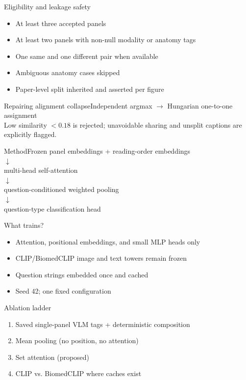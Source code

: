 \documentclass[aspectratio=169]{beamer}
\begin{document}
\begin{frame}{Eligibility and leakage safety}\begin{itemize}\item At least three accepted panels\item At least two panels with non-null modality or anatomy tags\item One same and one different pair when available\item Ambiguous anatomy cases skipped\item Paper-level split inherited and asserted per figure\end{itemize}\end{frame}
\begin{frame}{Repairing alignment collapse}\centering Independent argmax $\rightarrow$ Hungarian one-to-one assignment\\[1em]Low similarity $<0.18$ is rejected; unavoidable sharing and unsplit captions are explicitly flagged.\end{frame}
\begin{frame}{Method}\centering Frozen panel embeddings + reading-order embeddings\\$\downarrow$\\multi-head self-attention\\$\downarrow$\\question-conditioned weighted pooling\\$\downarrow$\\question-type classification head\end{frame}
\begin{frame}{What trains?}\begin{itemize}\item Attention, positional embeddings, and small MLP heads only\item CLIP/BiomedCLIP image and text towers remain frozen\item Question strings embedded once and cached\item Seed 42; one fixed configuration\end{itemize}\end{frame}
\begin{frame}{Ablation ladder}\begin{enumerate}\item Saved single-panel VLM tags + deterministic composition\item Mean pooling (no position, no attention)\item Set attention (proposed)\item CLIP vs. BiomedCLIP where caches exist\end{enumerate}\end{frame}
\end{document}
